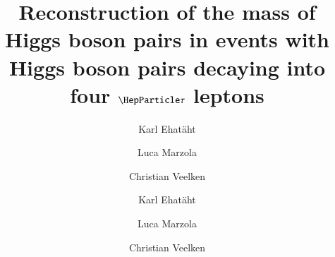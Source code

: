 \documentclass[a4paper,english,11pt]{article}
\begin{document}
\ifx\ver\verPAPER
\begin{frontmatter}
\fi

\title{Reconstruction of the mass of Higgs boson pairs in events with Higgs boson pairs
  decaying into four $\Pgt$ leptons}


\ifx\ver\verPreprint
\author[1]{Karl Ehat\"aht}
\author[1, 2]{Luca Marzola}
\author[1]{Christian Veelken}
\fi
\ifx\ver\verPAPER
\author[tallinn]{Karl Ehat\"aht}
\author[tartu]{Luca Marzola}
\author[tallinn]{Christian Veelken}
\address[tallinn]{National Institute for Chemical Physics and Biophysics, 10143 Tallinn, Estonia}
\address[tartu]{Institute of Physics, University of Tartu, 51014 Tartu, Estonia}
\fi


\end{frontmatter}
\end{document}
